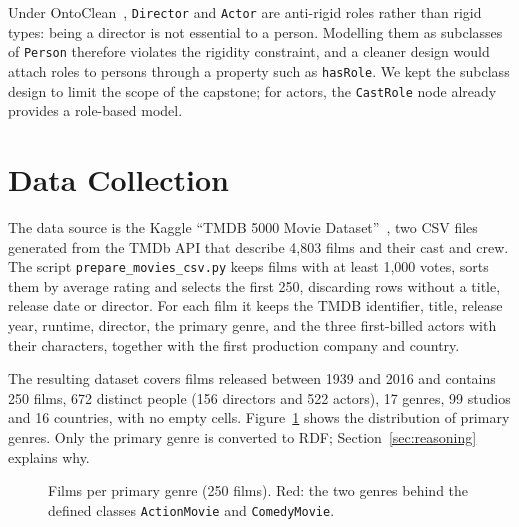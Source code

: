 \documentclass[11pt,a4paper]{article}
\newcommand{\code}[1]{\texttt{#1}}
\begin{document}
Under OntoClean~\cite{ontoclean}, \code{Director} and \code{Actor} are anti-rigid roles rather than rigid types: being a director is not essential to a person. Modelling them as subclasses of \code{Person} therefore violates the rigidity constraint, and a cleaner design would attach roles to persons through a property such as \code{hasRole}. We kept the subclass design to limit the scope of the capstone; for actors, the \code{CastRole} node already provides a role-based model.

\section{Data Collection}\label{sec:data}

The data source is the Kaggle ``TMDB 5000 Movie Dataset''~\cite{tmdb5000}, two CSV files generated from the TMDb API that describe 4,803 films and their cast and crew. The script \code{prepare\_movies\_csv.py} keeps films with at least 1,000 votes, sorts them by average rating and selects the first 250, discarding rows without a title, release date or director. For each film it keeps the TMDB identifier, title, release year, runtime, director, the primary genre, and the three first-billed actors with their characters, together with the first production company and country.

The resulting dataset covers films released between 1939 and 2016 and contains 250 films, 672 distinct people (156 directors and 522 actors), 17 genres, 99 studios and 16 countries, with no empty cells. Figure~\ref{fig:genres} shows the distribution of primary genres. Only the primary genre is converted to RDF; Section~\ref{sec:reasoning} explains why.

\begin{figure}[H]
\centering
{}
\caption{Films per primary genre (250 films). Red: the two genres behind the defined classes \code{ActionMovie} and \code{ComedyMovie}.}\label{fig:genres}
\end{figure}
\end{document}
